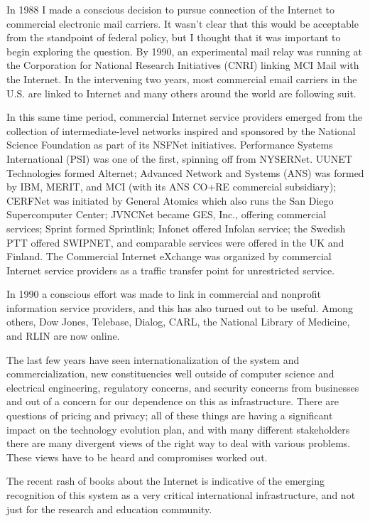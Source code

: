 \documentclass[10pt,a4paper]{scrartcl}
\begin{document}
In 1988 I made a conscious decision to pursue connection of the Internet to commercial electronic mail carriers. It wasn't clear that this would be acceptable from the standpoint of federal policy, but I thought that it was important to begin exploring the question. By 1990, an experimental mail relay was running at the Corporation for National Research Initiatives (CNRI) linking MCI Mail with the Internet. In the intervening two years, most commercial email carriers in the U.S. are linked to Internet and many others around the world are following suit.

In this same time period, commercial Internet service providers emerged from the collection of interme\-diate-level networks inspired and sponsored by the National Science Foundation as part of its NSFNet initiatives. Performance Systems International (PSI) was one of the first, spinning off from NYSERNet. UUNET Technologies formed Alternet; Advanced Network and Systems (ANS) was formed by IBM, MERIT, and MCI (with its ANS CO+RE commercial subsidiary); CERFNet was initiated by General Atomics which also runs the San Diego Supercomputer Center; JVNCNet became GES, Inc., offering commercial services; Sprint formed Sprintlink; Infonet offered Infolan service; the Swedish PTT offered SWIPNET, and comparable services were offered in the UK and Finland. The Commercial Internet eXchange was organized by commercial Internet service providers as a traffic transfer point for unrestricted service.

In 1990 a conscious effort was made to link in commercial and nonprofit information service providers, and this has also turned out to be useful. Among others, Dow Jones, Telebase, Dialog, CARL, the National Library of Medicine, and RLIN are now online.

The last few years have seen internationalization of the system and commercialization, new constituencies well outside of computer science and electrical engineering, regulatory concerns, and security concerns from businesses and out of a concern for our dependence on this as infrastructure. There are questions of pricing and privacy; all of these things are having a significant impact on the technology evolution plan, and with many different stakeholders there are many divergent views of the right way to deal with various problems. These views have to be heard and compromises worked out.

The recent rash of books about the Internet is indicative of the emerging recognition of this system as a very critical international infrastructure, and not just for the research and education community.
\end{document}
